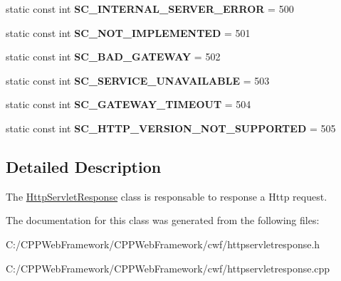 \begin{DoxyCompactItemize}
static const int {\bfseries S\+C\+\_\+\+I\+N\+T\+E\+R\+N\+A\+L\+\_\+\+S\+E\+R\+V\+E\+R\+\_\+\+E\+R\+R\+OR} = 500
\item 
\mbox{\label{class_http_servlet_response_a29bbe265aa6c97ddde0110e707e5e027}} 
static const int {\bfseries S\+C\+\_\+\+N\+O\+T\+\_\+\+I\+M\+P\+L\+E\+M\+E\+N\+T\+ED} = 501
\item 
\mbox{\label{class_http_servlet_response_a0f3a889cde6396de96e648aa4c49b84e}} 
static const int {\bfseries S\+C\+\_\+\+B\+A\+D\+\_\+\+G\+A\+T\+E\+W\+AY} = 502
\item 
\mbox{\label{class_http_servlet_response_aded2fd25e5c594b345740b3f11caa8a9}} 
static const int {\bfseries S\+C\+\_\+\+S\+E\+R\+V\+I\+C\+E\+\_\+\+U\+N\+A\+V\+A\+I\+L\+A\+B\+LE} = 503
\item 
\mbox{\label{class_http_servlet_response_afe4365a66d7eac9fa8db90089bb76b6b}} 
static const int {\bfseries S\+C\+\_\+\+G\+A\+T\+E\+W\+A\+Y\+\_\+\+T\+I\+M\+E\+O\+UT} = 504
\item 
\mbox{\label{class_http_servlet_response_ad63dea43b964dbd3ad326f976f001048}} 
static const int {\bfseries S\+C\+\_\+\+H\+T\+T\+P\+\_\+\+V\+E\+R\+S\+I\+O\+N\+\_\+\+N\+O\+T\+\_\+\+S\+U\+P\+P\+O\+R\+T\+ED} = 505
\end{DoxyCompactItemize}


\subsection{Detailed Description}
The \mbox{\hyperlink{class_http_servlet_response}{Http\+Servlet\+Response}} class is responsable to response a Http request. 

The documentation for this class was generated from the following files\+:\begin{DoxyCompactItemize}
\item 
C\+:/\+C\+P\+P\+Web\+Framework/\+C\+P\+P\+Web\+Framework/cwf/httpservletresponse.\+h\item 
C\+:/\+C\+P\+P\+Web\+Framework/\+C\+P\+P\+Web\+Framework/cwf/httpservletresponse.\+cpp\end{DoxyCompactItemize}
